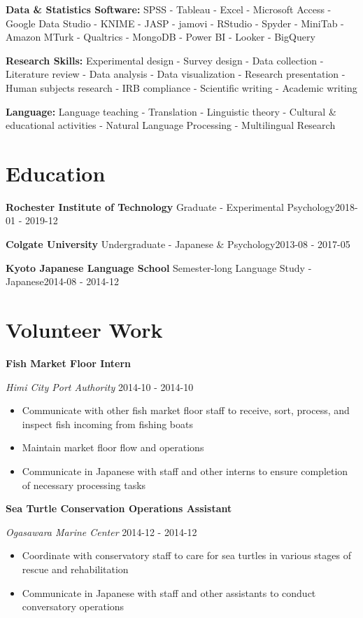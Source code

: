 \documentclass[a4paper,9pt]{extarticle}
\begin{document}
\noindent\textbf{Data \& Statistics Software:} SPSS - Tableau - Excel - Microsoft Access - Google Data Studio - KNIME - JASP - jamovi - RStudio - Spyder - MiniTab - Amazon MTurk - Qualtrics - MongoDB - Power BI - Looker - BigQuery

\noindent\textbf{Research Skills:} Experimental design - Survey design - Data collection - Literature review - Data analysis - Data visualization - Research presentation - Human subjects research - IRB compliance - Scientific writing - Academic writing

\noindent\textbf{Language:} Language teaching - Translation - Linguistic theory - Cultural \& educational activities - Natural Language Processing - Multilingual Research

\section*{Education}
\noindent\textbf{Rochester Institute of Technology}
Graduate - Experimental Psychology\hfill2018-01 - 2019-12

\noindent\textbf{Colgate University}
Undergraduate - Japanese \& Psychology\hfill2013-08 - 2017-05

\noindent\textbf{Kyoto Japanese Language School}
Semester-long Language Study - Japanese\hfill2014-08 - 2014-12

\section*{Volunteer Work}
\noindent\textbf{Fish Market Floor Intern} 

\noindent\textit{Himi City Port Authority} \hfill 2014-10 - 2014-10
\begin{itemize}\item Communicate with other fish market floor staff to receive, sort, process, and inspect fish incoming from fishing boats
\item Maintain market floor flow and operations
\item Communicate in Japanese with staff and other interns to ensure completion of necessary processing tasks
\end{itemize}
\noindent\textbf{Sea Turtle Conservation Operations Assistant} 

\noindent\textit{Ogasawara Marine Center} \hfill 2014-12 - 2014-12
\begin{itemize}\item Coordinate with conservatory staff to care for sea turtles in various stages of rescue and rehabilitation
\item Communicate in Japanese with staff and other assistants to conduct conversatory operations
\end{itemize}
\end{document}
